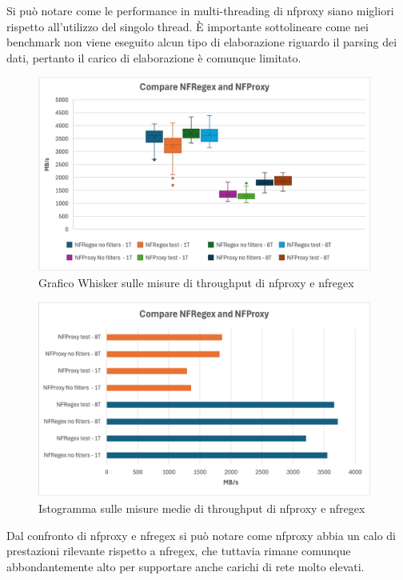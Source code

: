 Si può notare come le performance in multi-threading di nfproxy siano migliori rispetto all'utilizzo del singolo thread. È importante sottolineare come nei benchmark non viene eseguito alcun tipo di elaborazione riguardo il parsing dei dati, pertanto il carico di elaborazione è comunque limitato.\\

\begin{figure}[H]
    \centering
    \includegraphics[width=0.98\textwidth]{images/chapter4/whisker_compare.png}
    \caption{Grafico Whisker sulle misure di throughput di nfproxy e nfregex}\label{fig:wisker_nfproxy_nfregex}
\end{figure}

\begin{figure}[H]
    \centering
    \includegraphics[width=0.98\textwidth]{images/chapter4/istrogramma_compare.png}
    \caption{Istogramma sulle misure medie di throughput di nfproxy e nfregex}\label{fig:istogramma_nfproxy_nfregex}
\end{figure}

Dal confronto di nfproxy e nfregex si può notare come nfproxy abbia un calo di prestazioni rilevante rispetto a nfregex, che tuttavia rimane comunque abbondantemente alto per supportare anche carichi di rete molto elevati.\\
